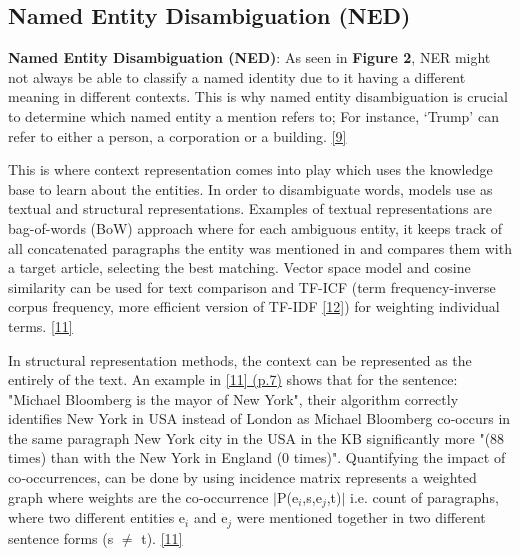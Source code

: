 \subsection{Named Entity Disambiguation (NED)}

\textbf{Named Entity Disambiguation (NED)}: As seen in \textbf{Figure 2}, NER might not always be able to classify a named identity due to it having a different meaning in different contexts. This is why named entity disambiguation is crucial to determine which
named entity a mention refers to; For instance, ‘Trump’ can refer to either a person, a corporation or a building. \hyperlink{9}{[9]}

This is where context representation comes into play which uses the knowledge base to learn about the entities. In order to disambiguate words, models use as textual and structural representations. Examples of textual representations are bag-of-words (BoW) approach where for each ambiguous entity, it keeps track of all concatenated paragraphs the entity was mentioned in and compares them with a target article, selecting the best matching. Vector space model and cosine similarity can be used for text comparison and TF-ICF (term frequency-inverse corpus frequency, more efficient version of TF-IDF  \hyperlink{12}{[12]}) for weighting individual terms.  \hyperlink{11}{[11]} 

In structural representation methods, the context can be represented as the entirely of the text.
An example in \hyperlink{11}{[11] (p.7)} shows that for the sentence: "Michael Bloomberg is the mayor of New York", their algorithm correctly identifies New York in USA instead of London as Michael Bloomberg co‐occurs in the same paragraph New York city in the USA in the KB significantly more "(88 times) than with the New York in England (0 times)". Quantifying  the impact of co‐occurrences, can be done by using incidence matrix represents a weighted graph where weights are the co‐occurrence $|$P(e$_{i}$,s,e$_{j}$,t)$|$ i.e. count of paragraphs, where two different entities e$_{i}$ and e$_{j}$ were mentioned together in two different sentence forms (s $\neq$ t). \hyperlink{11}{[11]}


